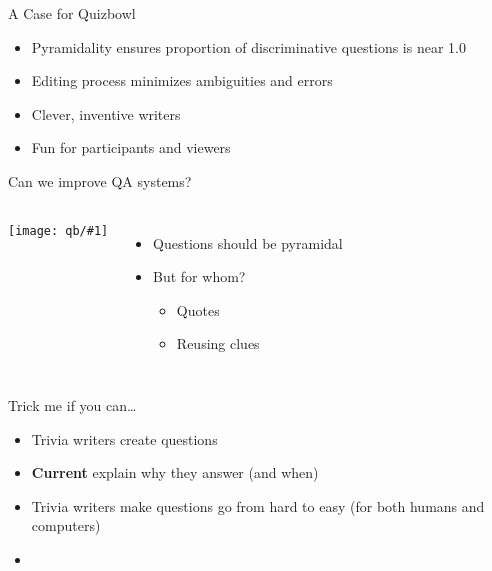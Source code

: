 \documentclass[xcolor=dvipsnames,xcolor=table]{beamer}
\newcommand{\fsi}[2]{
\begin{frame}[plain]
\vspace*{-1pt}
\makebox[\linewidth]{\texttt{[image: \#1]}}
\begin{center}
#2
\end{center}
\end{frame}
}
\newcommand{\gfxq}[2]{
\begin{center}
	\texttt{[image: qb/\#1]}
\end{center}
}
\begin{document}
\begin{frame}{A Case for Quizbowl}

  \begin{itemize}
    \item Pyramidality ensures proportion of discriminative questions is near 1.0
    \item Editing process minimizes ambiguities and errors
    \item Clever, inventive writers
    \item Fun for participants and viewers
  \end{itemize}
\end{frame}


\begin{frame}{Can we improve QA systems?}

\begin{columns}
     \gfxq{trick/pyramid}{.9}
     \begin{itemize}
       \item Questions should be pyramidal
       \item But for whom?
         \begin{itemize}
           \item Quotes
           \item Reusing clues
         \end{itemize}
     \end{itemize}
\end{columns}
\end{frame}

\fsi{qb/jennings_handshake}{}


\begin{frame}{Trick me if you can\dots}

  \begin{itemize}
  \item Trivia writers create questions
  \item {\bf Current} explain why they answer (and when)
  \item Trivia writers make questions go from hard to easy (for both
    humans and computers)
    \pause
    \item {} 
  \end{itemize}

\end{frame}

\end{document}
